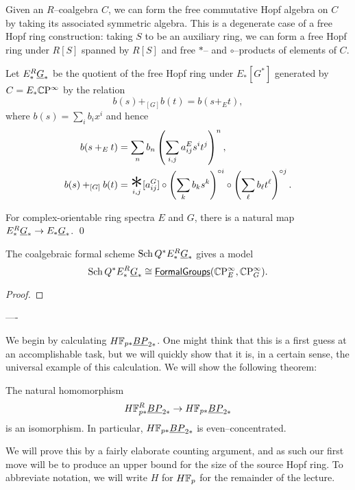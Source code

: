 Given an $R$--coalgebra $C$, we can form the free commutative Hopf algebra on $C$ by taking its associated symmetric algebra.  This is a degenerate case of a free Hopf ring construction: taking $S$ to be an auxiliary ring, we can form a free Hopf ring under $R[S]$ spanned by $R[S]$ and free $\ast$-- and $\circ$--products of elements of $C$.

\begin{definition}
Let $E_*^R \underline{\smash{G}}_{*}$ be the quotient of the free Hopf ring under $E_*[G^*]$ generated by $C = E_* \mathbb{C}\mathrm P^\infty$ by the relation \[b(s) +_{[G]} b(t) = b(s +_E t),\] where $b(s) = \sum_i b_i x^i$ and hence
\begin{align*}
b(s +_E t) & = \sum_n b_n \left(\sum_{i, j} a_{ij}^E s^i t^j \right)^n, \\
b(s) +_{[G]} b(t) & = \bigast_{i, j} [a_{ij}^G] \circ \left( \sum_k b_k s^k \right)^{\circ i} \circ \left( \sum_\ell b_\ell t^\ell \right)^{\circ j}.
\end{align*}
\end{definition}

\begin{lemma}
For complex-orientable ring spectra $E$ and $G$, there is a natural map $E_*^R \underline{\smash{G}}_{*} \to E_* \underline{\smash{G}}_{*}$. \qed
\end{lemma}

\begin{theorem}
The coalgebraic formal scheme $\operatorname{Sch} Q^* E_*^R \underline{\smash{G}}_{*}$ gives a model \[\operatorname{Sch} Q^* E_*^R \underline{\smash{G}}_{*} \cong \operatorname{\underline{\smash{\mathsf{FormalGroups}}}}(\mathbb{C}\mathrm P^\infty_E, \mathbb{C}\mathrm P^\infty_G).\]
\end{theorem}
\begin{proof}
\end{proof}

----

We begin by calculating $H\mathbb F_{p*} \underline{\smash{BP}}_{2*}$.  One might think that this is a first guess at an accomplishable task, but we will quickly show that it is, in a certain sense, the universal example of this calculation.  We will show the following theorem:
\begin{theorem}\label{HFpBPCooperationsTheorem}
The natural homomorphism \[H\mathbb F_{p*}^R \underline{\smash{BP}}_{2*} \to H\mathbb F_{p*} \underline{\smash{BP}}_{2*}\] is an isomorphism.  In particular, $H\mathbb F_{p*} \underline{\smash{BP}}_{2*}$ is even--concentrated.
\end{theorem}
\noindent We will prove this by a fairly elaborate counting argument, and as such our first move will be to produce an upper bound for the size of the source Hopf ring.  To abbreviate notation, we will write $H$ for $H\mathbb F_p$ for the remainder of the lecture.

